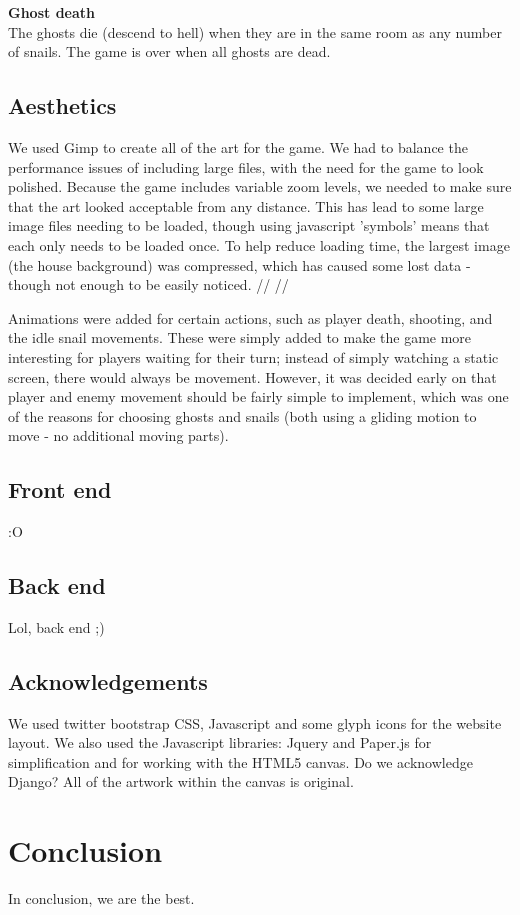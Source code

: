 \documentclass{article}
\begin{document}
\textbf{Ghost death} \\
The ghosts die (descend to hell) when they are in the same room as any number of snails. The game is over when all ghosts are dead.

\subsection{Aesthetics}
We used Gimp to create all of the art for the game. We had to balance the performance issues of including large files, with the need for the game to look polished. Because the game includes variable zoom levels, we needed to make sure that the art looked acceptable from any distance. This has lead to some large image files needing to be loaded, though using javascript 'symbols' means that each only needs to be loaded once. To help reduce loading time, the largest image (the house background) was compressed, which has caused some lost data - though not enough to be easily noticed. // // 

Animations were added for certain actions, such as player death, shooting, and the idle snail movements. These were simply added to make the game more interesting for players waiting for their turn; instead of simply watching a static screen, there would always be movement. However, it was decided early on that player and enemy movement should be fairly simple to implement, which was one of the reasons for choosing ghosts and snails (both using a gliding motion to move - no additional moving parts).

\subsection{Front end}
:O
\subsection{Back end}
Lol, back end ;)
\subsection{Acknowledgements}
We used twitter bootstrap CSS, Javascript and some glyph icons for the website layout. We also used the Javascript libraries: Jquery and Paper.js for simplification and for working with the HTML5 canvas. Do we acknowledge Django? All of the artwork within the canvas is original.

\section{Conclusion}
In conclusion, we are the best.
\end{document}

